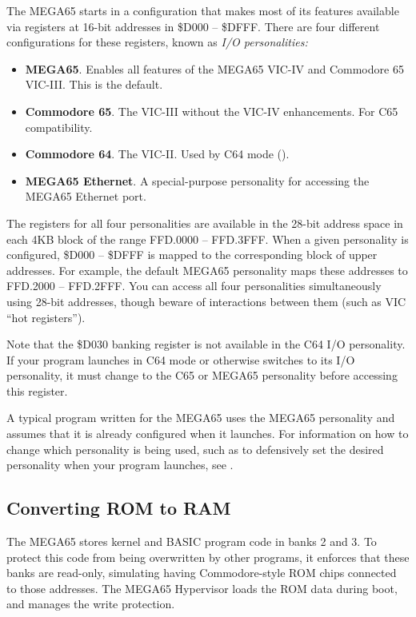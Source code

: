 The MEGA65 starts in a configuration that makes most of its features available
via registers at 16-bit addresses in \$D000 -- \$DFFF. There are four different
configurations for these registers, known as {\em I/O personalities:}

\begin{itemize}
\item {\bf MEGA65}. Enables all features of the MEGA65 VIC-IV and Commodore 65
VIC-III. This is the default.
\item {\bf Commodore 65}. The VIC-III without the VIC-IV enhancements. For C65 compatibility.
\item {\bf Commodore 64}. The VIC-II. Used by C64 mode ().
\item {\bf MEGA65 Ethernet}. A special-purpose personality for accessing the
MEGA65 Ethernet port.
\end{itemize}

The registers for all four personalities are available in the 28-bit address
space in each 4KB block of the range FFD.0000 -- FFD.3FFF. When a given
personality is configured, \$D000 -- \$DFFF is mapped to the corresponding
block of upper addresses. For example, the default MEGA65 personality maps
these addresses to FFD.2000 -- FFD.2FFF. You can access all four personalities
simultaneously using 28-bit addresses, though beware of interactions between
them (such as VIC ``hot registers'').

Note that the \$D030 banking register is not available in the C64 I/O
personality. If your program launches in C64 mode or otherwise switches to its
I/O personality, it must change to the C65 or MEGA65 personality before
accessing this register.

A typical program written for the MEGA65 uses the MEGA65 personality and
assumes that it is already configured when it launches. For information on how
to change which personality is being used, such as to defensively set the
desired personality when your program launches, see .

\subsection{Converting ROM to RAM}

The MEGA65 stores kernel and BASIC program code in banks 2 and 3. To protect
this code from being overwritten by other programs, it enforces that these
banks are read-only, simulating having Commodore-style ROM chips connected to
those addresses. The MEGA65 Hypervisor loads the ROM data during boot, and
manages the write protection.

